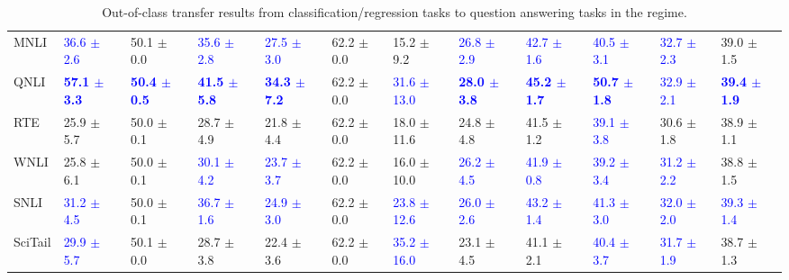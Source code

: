 \begin{landscape}
\begin{table}[t]
\begin{adjustbox}{max width=2\textwidth}
\begin{tabular}{ l l l l l  l l l l  l l l }
MNLI & \textcolor{blue}{36.6 $\pm$ 2.6} & 50.1 $\pm$ 0.0 & \textcolor{blue}{35.6 $\pm$ 2.8} & \textcolor{blue}{27.5 $\pm$ 3.0} & 62.2 $\pm$ 0.0 & 15.2 $\pm$ 9.2 & \textcolor{blue}{26.8 $\pm$ 2.9} & \textcolor{blue}{42.7 $\pm$ 1.6} & \textcolor{blue}{40.5 $\pm$ 3.1} & \textcolor{blue}{32.7 $\pm$ 2.3} & 39.0 $\pm$ 1.5\\
QNLI & \textbf{\textcolor{blue}{57.1 $\pm$ 3.3}} & \textbf{\textcolor{blue}{50.4 $\pm$ 0.5}} & \textbf{\textcolor{blue}{41.5 $\pm$ 5.8}} & \textbf{\textcolor{blue}{34.3 $\pm$ 7.2}} & 62.2 $\pm$ 0.0 & \textcolor{blue}{31.6 $\pm$ 13.0} & \textbf{\textcolor{blue}{28.0 $\pm$ 3.8}} & \textbf{\textcolor{blue}{45.2 $\pm$ 1.7}} & \textbf{\textcolor{blue}{50.7 $\pm$ 1.8}} & \textcolor{blue}{32.9 $\pm$ 2.1} & \textbf{\textcolor{blue}{39.4 $\pm$ 1.9}}\\
RTE & 25.9 $\pm$ 5.7 & 50.0 $\pm$ 0.1 & 28.7 $\pm$ 4.9 & 21.8 $\pm$ 4.4 & 62.2 $\pm$ 0.0 & 18.0 $\pm$ 11.6 & 24.8 $\pm$ 4.8 & 41.5 $\pm$ 1.2 & \textcolor{blue}{39.1 $\pm$ 3.8} & 30.6 $\pm$ 1.8 & 38.9 $\pm$ 1.1\\
WNLI & 25.8 $\pm$ 6.1 & 50.0 $\pm$ 0.1 & \textcolor{blue}{30.1 $\pm$ 4.2} & \textcolor{blue}{23.7 $\pm$ 3.7} & 62.2 $\pm$ 0.0 & 16.0 $\pm$ 10.0 & \textcolor{blue}{26.2 $\pm$ 4.5} & \textcolor{blue}{41.9 $\pm$ 0.8} & \textcolor{blue}{39.2 $\pm$ 3.4} & \textcolor{blue}{31.2 $\pm$ 2.2} & 38.8 $\pm$ 1.5\\
SNLI & \textcolor{blue}{31.2 $\pm$ 4.5} & 50.0 $\pm$ 0.1 & \textcolor{blue}{36.7 $\pm$ 1.6} & \textcolor{blue}{24.9 $\pm$ 3.0} & 62.2 $\pm$ 0.0 & \textcolor{blue}{23.8 $\pm$ 12.6} & \textcolor{blue}{26.0 $\pm$ 2.6} & \textcolor{blue}{43.2 $\pm$ 1.4} & \textcolor{blue}{41.3 $\pm$ 3.0} & \textcolor{blue}{32.0 $\pm$ 2.0} & \textcolor{blue}{39.3 $\pm$ 1.4}\\
SciTail & \textcolor{blue}{29.9 $\pm$ 5.7} & 50.1 $\pm$ 0.0 & 28.7 $\pm$ 3.8 & 22.4 $\pm$ 3.6 & 62.2 $\pm$ 0.0 & \textcolor{blue}{35.2 $\pm$ 16.0} & 23.1 $\pm$ 4.5 & 41.1 $\pm$ 2.1 & \textcolor{blue}{40.4 $\pm$ 3.7} & \textcolor{blue}{31.7 $\pm$ 1.9} & 38.7 $\pm$ 1.3\\
\bottomrule
\end{tabular}
\end{adjustbox}
\caption{Out-of-class transfer results from classification/regression tasks to question answering tasks in the  regime.}
\label{tbla9b}
\end{table}
\end{landscape}